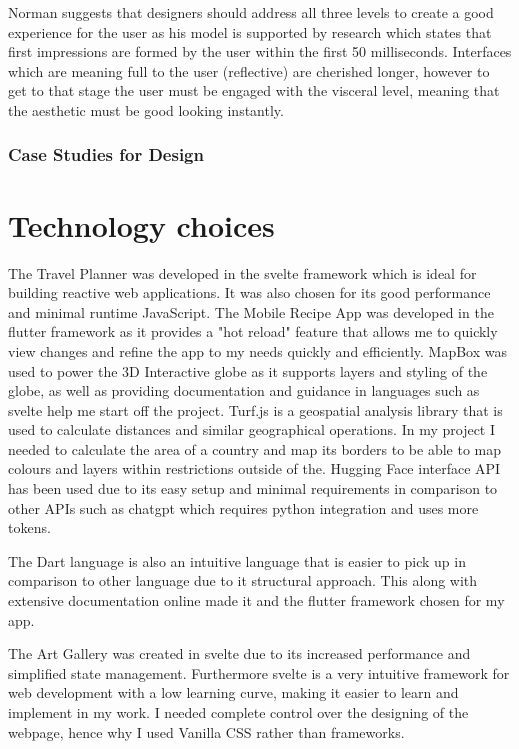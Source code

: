 \documentclass[]{project_final}
\begin{document}
Norman suggests that designers should address all three levels to create a good experience for the user as his model is supported by research which states that first impressions are formed by the user within the first 50 milliseconds. Interfaces which are meaning full to the user (reflective) are cherished longer, however to get to that stage the user must be engaged with the visceral level, meaning that the aesthetic must be good looking instantly.\cite{noauthor_3_nodate}

\subsubsection{Case Studies for Design}

\section{Technology choices}
The Travel Planner was developed in the svelte framework which is ideal for building reactive web applications. It was also chosen for its good performance and minimal runtime JavaScript.
The Mobile Recipe App was developed in the flutter framework as it provides a "hot reload" feature that allows me to quickly view changes and refine the app to my needs quickly and efficiently.
MapBox was used to power the 3D Interactive globe as it supports layers  and styling of the globe, as well as providing documentation and guidance in languages such as svelte help me start off the project.
Turf.js is a geospatial analysis library that is used to calculate distances and similar geographical operations. In my project I needed to calculate the area of a country and map its borders to be able to map colours and layers within restrictions outside of the.
Hugging Face interface API has been used due to its easy setup and minimal requirements in comparison to other APIs such as chatgpt which requires python integration and uses more tokens.

The Dart language is also an intuitive language that is easier to pick up in comparison to other language due to it structural approach. This along with extensive documentation online made it and the flutter framework chosen for my app.

The Art Gallery was created in svelte due to its increased performance and simplified state management. Furthermore svelte is a very intuitive framework for web development with a low learning curve, making it easier to learn and implement in my work. I needed complete control over the designing of the webpage, hence why I used Vanilla CSS rather than frameworks.
\end{document}
